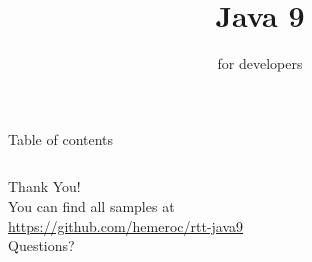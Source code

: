 \documentclass[10pt,xcolor={dvipsnames}]{beamer}
\begin{document}
{
	\title{Java 9}
	\subtitle{for developers}
	\maketitle
}
\begin{frame}{Table of contents}
 \begin{columns}
 	\begin{column}{.45\textwidth}
 		\fontsize{10}{18}\selectfont
		\tableofcontents[sections=1-5]
	\end{column}
	\begin{column}{.45\textwidth}
		\fontsize{10}{18}\selectfont
		\tableofcontents[sections=6-10]
	\end{column}
\end{columns}
\end{frame}


\begin{frame}[standout]
\fontsize{20}{0}\selectfont
Thank You!\\
\vspace{0.5cm}
\fontsize{10}{0}\selectfont
You can find all samples at\\
\vspace{0.5cm}
\url{https://github.com/hemeroc/rtt-java9}\\
\vspace{0.5cm}
\fontsize{20}{0}\selectfont
Questions?
\end{frame}
\end{document}
